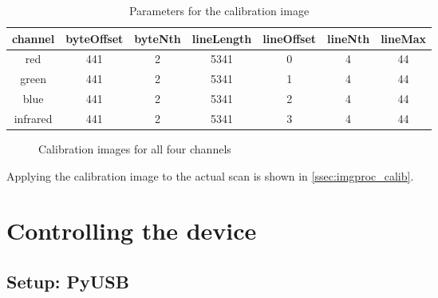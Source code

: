 \documentclass{article}
\begin{document}
\begin{table}[H]
  \caption{Parameters for the calibration image}
  \centering
  \begin{tabular}{c | c | c | c | c | c | c}
    channel & byteOffset & byteNth & lineLength & lineOffset & lineNth & lineMax \\ \hline
    red & 441 & 2 & 5341 & 0 & 4 & 44 \\
    green & 441 & 2 & 5341 & 1 & 4 & 44 \\
    blue & 441 & 2 & 5341 & 2 & 4 & 44 \\
    infrared & 441 & 2 & 5341 & 3 & 4 & 44 \\
  \end{tabular}
\end{table}


\begin{figure}[H]
  \caption{Calibration images for all four channels}
  \centering
  
\end{figure}

Applying the calibration image to the actual scan is shown in \autoref{ssec:imgproc_calib}.

\section{Controlling the device}

\subsection{Setup: PyUSB}
\end{document}
